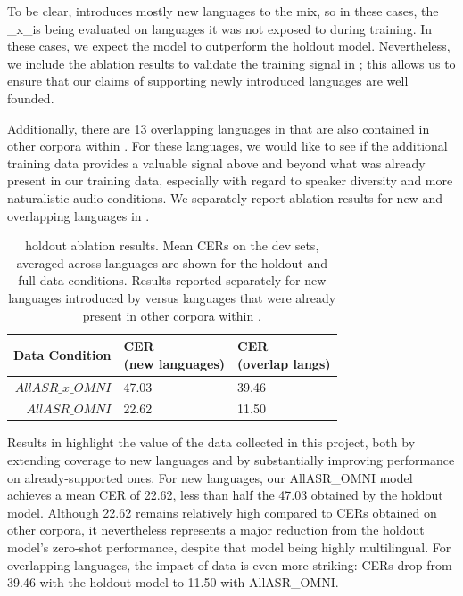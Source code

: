 To be clear, \vendoromsf introduces mostly new languages to the mix, so in these cases, the \allasr{}\_x\_\vendoromsf is being evaluated on languages it was not exposed to during training. In these cases, we expect the \allasr{} model to outperform the holdout model. Nevertheless, we include the ablation results to validate the training signal in \vendoromsf; this allows us to ensure that our claims of supporting newly introduced languages are well founded.

Additionally, there are 13 overlapping languages in \vendoromsf that are also contained in other corpora within \allasr{}. For these languages, we would like to see if the additional \vendoromsf training data provides a valuable signal above and beyond what was already present in our training data, especially with regard to speaker diversity and more naturalistic audio conditions. We separately report ablation results for new and overlapping languages in .

\begin{table}
    \centering
    \begin{tabular}{rll}
        \toprule
         Data Condition & \makecell{CER\\(new languages)} & \makecell{CER\\(overlap langs)} \\
         \midrule
         $AllASR\_x\_OMNI$ & 47.03 & 39.46 \\
         $AllASR\_OMNI$ & 22.62 & 11.50 \\
    \bottomrule
    \end{tabular}
    \caption{\vendoromsf holdout ablation results. Mean CERs on the \vendoromsf dev sets, averaged across languages are shown for the holdout and full-data conditions. Results reported separately for new languages introduced by \vendoromsf versus languages that were already present in other corpora within \allasr{}.}
    \label{tab:omni_holdout_ablation}
\end{table}

Results in  highlight the value of the \vendoromsf data collected in this project, both by extending coverage to new languages and by substantially improving performance on already-supported ones. For new languages, our AllASR\_OMNI model achieves a mean CER of 22.62, less than half the 47.03 obtained by the holdout model. Although 22.62 remains relatively high compared to CERs obtained on other corpora, it nevertheless represents a major reduction from the holdout model’s zero-shot performance, despite that model being highly multilingual. For overlapping languages, the impact of \vendoromsf data is even more striking: CERs drop from 39.46 with the holdout model to 11.50 with AllASR\_OMNI.

